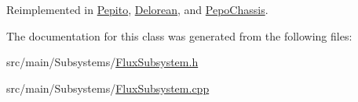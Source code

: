 Reimplemented in \hyperlink{classPepito_ac19e921b35d2d76cb5b6a2105b26f568}{Pepito}, \hyperlink{classDelorean_a6053dfc106d71fcffa30bac0f5e9b5b8}{Delorean}, and \hyperlink{classPepoChassis_af863b7df039af7051b08c051f744e429}{Pepo\+Chassis}.



The documentation for this class was generated from the following files\+:\begin{DoxyCompactItemize}
\item 
src/main/\+Subsystems/\hyperlink{FluxSubsystem_8h}{Flux\+Subsystem.\+h}\item 
src/main/\+Subsystems/\hyperlink{FluxSubsystem_8cpp}{Flux\+Subsystem.\+cpp}\end{DoxyCompactItemize}

